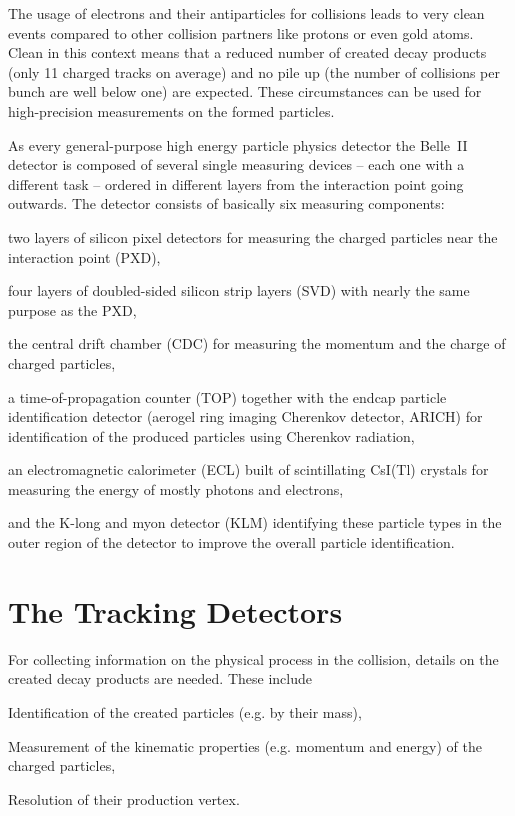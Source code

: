 The usage of electrons and their antiparticles for collisions leads to very clean events compared to other collision partners like protons or even gold atoms. Clean in this context means that a reduced number of created decay products (only 11 charged tracks on average) and no pile up (the number of collisions per bunch are well below one) are expected. These circumstances can be used for high-precision measurements on the formed particles.

As every general-purpose high energy particle physics detector the Belle~II detector is composed of several single measuring devices -- each one with a different task -- ordered in different layers from the interaction point going outwards. The detector consists of basically six measuring components:
\begin{zlist}
  \item two layers of silicon pixel detectors for measuring the charged particles near the interaction point (PXD),
  \item four layers of doubled-sided silicon strip layers (SVD) with nearly the same purpose as the PXD,
  \item the central drift chamber (CDC) for measuring the momentum and the charge of charged particles,
  \item a time-of-propagation counter (TOP) together with the endcap particle identification detector (aerogel ring imaging Cherenkov detector, ARICH) for identification of the produced particles using Cherenkov radiation,
  \item an electromagnetic calorimeter (ECL) built of scintillating CsI(Tl) crystals for measuring the energy of mostly photons and electrons,
  \item and the K-long and myon detector (KLM) identifying these particle types in the outer region of the detector to improve the overall particle identification.
\end{zlist}

\section{The Tracking Detectors}

For collecting information on the physical process in the collision, details on the created decay products are needed. These include
\begin{zlist}
 \item Identification of the created particles (e.g. by their mass),
 \item Measurement of the kinematic properties (e.g. momentum and energy) of the charged particles,
 \item Resolution of their production vertex.
\end{zlist}

